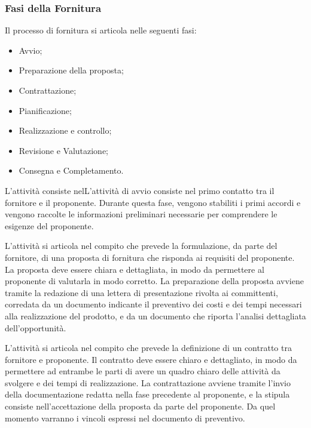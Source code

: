 \subsubsection{Fasi della Fornitura}
\label{sec:Fasi della Fornitura}
Il processo di fornitura si articola nelle seguenti fasi:
\begin{itemize}
    \item Avvio;
    \item Preparazione della proposta;
    \item Contrattazione;
    \item Pianificazione;
    \item Realizzazione e controllo;
    \item Revisione e Valutazione;
    \item Consegna e Completamento.
\end{itemize}

L'attività consiste nelL'attività di avvio consiste nel primo contatto tra il fornitore e il proponente. Durante questa fase, vengono stabiliti i primi accordi e vengono raccolte le informazioni preliminari necessarie per comprendere le esigenze del proponente.

L'attività si articola nel compito che prevede la formulazione, da parte del fornitore, di una proposta di fornitura che risponda ai requisiti del proponente. La proposta deve essere chiara e dettagliata, in modo da permettere al proponente di valutarla in modo corretto. La preparazione della proposta avviene tramite la redazione di una lettera di presentazione rivolta ai committenti, corredata da un documento indicante il preventivo dei costi e dei tempi necessari alla realizzazione del prodotto, e da un documento che riporta l'analisi dettagliata dell'opportunità.

L'attività si articola nel compito che prevede la definizione di un contratto tra fornitore e proponente. Il contratto deve essere chiaro e dettagliato, in modo da permettere ad entrambe le parti di avere un quadro chiaro delle attività da svolgere e dei tempi di realizzazione. La contrattazione avviene tramite l'invio della documentazione redatta nella fase precedente al proponente, e la stipula consiste nell'accettazione della proposta da parte del proponente. Da quel momento varranno i vincoli espressi nel documento di preventivo.

